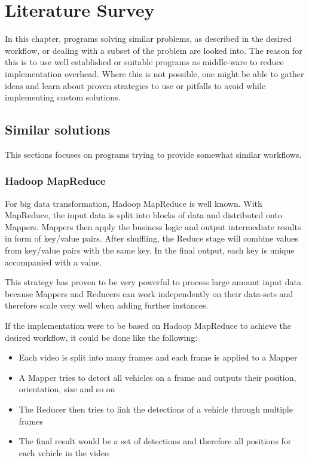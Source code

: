 \chapter{Literature Survey}
\label{state_of_the_art}


In this chapter, programs solving similar problems, as described in the desired workflow, or dealing with a subset of the problem are looked into.
The reason for this is to use well established or suitable programs as middle-ware to reduce implementation overhead.
Where this is not possible, one might be able to gather ideas and learn about proven strategies to use or pitfalls to avoid while implementing custom solutions.

\section{Similar solutions}

This sections focuses on programs trying to provide somewhat similar workflows.

\subsection{Hadoop MapReduce}
\label{hadoop}
\label{hadoopfs}
\label{mapreduce}

For big data transformation, Hadoop MapReduce\cite{hdfs:main} is well known.
With MapReduce, the input data is split into blocks of data and distributed onto Mappers.
Mappers then apply the business logic and output intermediate results in form of key/value pairs.
After shuffling, the Reduce stage will combine values from key/value pairs with the same key.
In the final output, each key is unique accompanied with a value.

This strategy has proven to be very powerful to process large amount input data because Mappers and Reducers can work independently on their data-sets and therefore scale very well when adding further instances.

If the implementation were to be based on Hadoop MapReduce to achieve the desired workflow, it could be done like the following:
\begin{itemize}
	\item Each video is split into many frames and each frame is applied to a Mapper
	\item A Mapper tries to detect all vehicles on a frame and outputs their position, orientation, size and so on
	\item The Reducer then tries to link the detections of a vehicle through multiple frames
	\item The final result would be a set of detections and therefore all positions for each vehicle in the video
\end{itemize}

